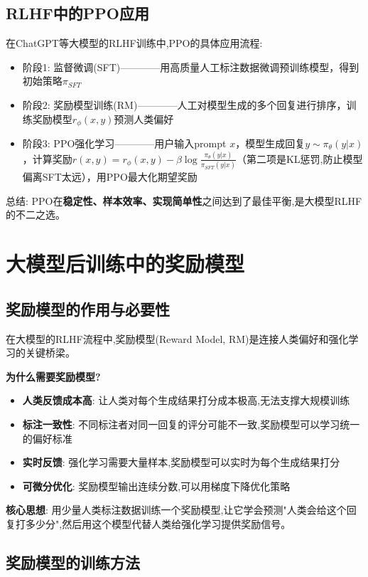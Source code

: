 \documentclass[UTF8]{ctexart}
\begin{document}
\subsection{RLHF中的PPO应用}

在ChatGPT等大模型的RLHF训练中,PPO的具体应用流程:
\begin{itemize}
    \item[1] 阶段1: 监督微调(SFT)————用高质量人工标注数据微调预训练模型，得到初始策略$\pi_{SFT}$
    \item[2] 阶段2: 奖励模型训练(RM)————人工对模型生成的多个回复进行排序，训练奖励模型$r_\phi(x,y)$预测人类偏好
    \item[3] 阶段3: PPO强化学习————用户输入prompt $x$，模型生成回复$y \sim \pi_\theta(y|x)$，计算奖励$r(x,y) = r_\phi(x,y) - \beta \log\frac{\pi_\theta(y|x)}{\pi_{SFT}(y|x)}$（第二项是KL惩罚,防止模型偏离SFT太远），用PPO最大化期望奖励
\end{itemize}

总结: PPO在\textbf{稳定性、样本效率、实现简单性}之间达到了最佳平衡,是大模型RLHF的不二之选。

\section{大模型后训练中的奖励模型}

\subsection{奖励模型的作用与必要性}

在大模型的RLHF流程中,奖励模型(Reward Model, RM)是连接人类偏好和强化学习的关键桥梁。

\textbf{为什么需要奖励模型?}

\begin{itemize}
    \item \textbf{人类反馈成本高}: 让人类对每个生成结果打分成本极高,无法支撑大规模训练
    \item \textbf{标注一致性}: 不同标注者对同一回复的评分可能不一致,奖励模型可以学习统一的偏好标准
    \item \textbf{实时反馈}: 强化学习需要大量样本,奖励模型可以实时为每个生成结果打分
    \item \textbf{可微分优化}: 奖励模型输出连续分数,可以用梯度下降优化策略
\end{itemize}

\textbf{核心思想}: 用少量人类标注数据训练一个奖励模型,让它学会预测"人类会给这个回复打多少分",然后用这个模型代替人类给强化学习提供奖励信号。
\subsection{奖励模型的训练方法}
\end{document}
